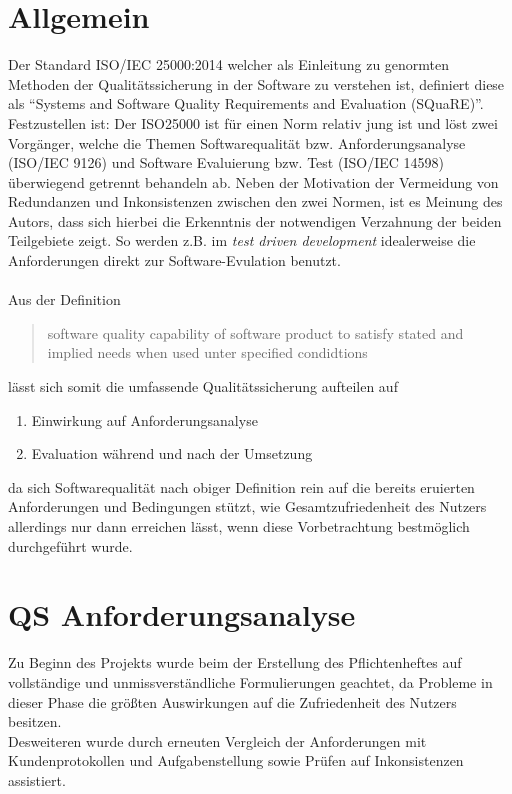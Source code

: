 \section{Allgemein}
Der Standard ISO/IEC 25000:2014 welcher als Einleitung zu genormten Methoden der Qualitätssicherung in der Software zu verstehen ist, definiert diese als "`Systems and Software Quality Requirements and Evaluation (SQuaRE)"'\cite[Foreword]{ISO25000}. Festzustellen ist: Der ISO25000 ist für einen Norm relativ jung ist und löst zwei Vorgänger, welche die Themen Softwarequalität bzw. Anforderungsanalyse (ISO/IEC 9126) und Software Evaluierung bzw. Test (ISO/IEC 14598) überwiegend getrennt behandeln ab. Neben der Motivation der Vermeidung von Redundanzen und Inkonsistenzen zwischen den zwei Normen, ist es Meinung des Autors, dass sich hierbei die Erkenntnis der notwendigen Verzahnung der beiden Teilgebiete zeigt. So werden z.B. im \textit{test driven development} idealerweise die Anforderungen direkt zur Software-Evulation benutzt.

\paragraph*{}Aus der Definition
\begin{quote}\label{PD_SQ}
software quality
capability of software product to satisfy stated and implied needs when used unter specified condidtions
\end{quote}\cite[4 Terms and definitions]{ISO25000}
lässt sich somit die umfassende Qualitätssicherung aufteilen auf
\begin{enumerate}
\item Einwirkung auf Anforderungsanalyse
\item Evaluation während und nach der Umsetzung
\end{enumerate}
da sich Softwarequalität nach obiger Definition rein auf die bereits eruierten Anforderungen und Bedingungen stützt, wie Gesamtzufriedenheit des Nutzers allerdings nur dann erreichen lässt, wenn diese Vorbetrachtung bestmöglich durchgeführt wurde.
\section{QS Anforderungsanalyse}
Zu Beginn des Projekts wurde beim der Erstellung des Pflichtenheftes auf vollständige und unmissverständliche Formulierungen geachtet, da Probleme in dieser Phase die größten Auswirkungen auf die Zufriedenheit des Nutzers besitzen.\\
Desweiteren wurde durch erneuten Vergleich der Anforderungen mit Kundenprotokollen und Aufgabenstellung sowie Prüfen auf Inkonsistenzen assistiert.

